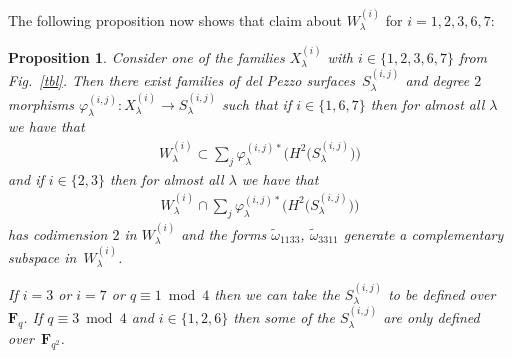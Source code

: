\documentclass[pdftex]{sigma}
\numberwithin{equation}{section}
\newtheorem{Proposition}[Theorem]{Proposition}
 { \theoremstyle{definition}
\newtheorem{Definition}[Theorem]{Definition}
\newtheorem{notation}[Theorem]{Notation}
\newtheorem{Example}[Theorem]{Example}
\newtheorem{Remark}[Theorem]{Remark} }
\begin{document}
The following proposition now shows that claim about $W_{\lambda}^{(i)}$ for $i=1,2,3,6,7$:

\begin{Proposition}\label{prpdelPezzo} Consider one of the families $X_{\lambda}^{(i)}$ with $i\in \{1,2,3,6,7\}$ from Fig.~{\rm \ref{tbl}}. Then there exist families of del Pezzo surfaces~$S^{(i,j)}_{\lambda}$ and degree $2$ morphisms $\varphi^{(i,j)}_{\lambda}\colon X_{\lambda}^{(i)} \to S^{(i,j)}_{\lambda}$ such that if $i\in \{1,6,7\}$ then for almost all $\lambda$ we have that
\begin{gather*} W_\lambda^{(i)} \subset \sum_j \varphi^{(i,j)*}_{\lambda} \big(H^2\big(S^{(i,j)}_{\lambda}\big)\big)\end{gather*}
and if $i\in \{2,3\}$ then for almost all $\lambda$ we have that
\begin{gather*} W_\lambda^{(i)} \cap \sum_j \varphi^{(i,j)*}_{\lambda} \big(H^2\big(S^{(i,j)}_{\lambda}\big) \big)\end{gather*}
has codimension $2$ in $W_{\lambda}^{(i)}$ and the forms $\tilde{\omega}_{1133}$, $\tilde{\omega}_{3311}$ generate a complementary subspace in~$W_\lambda^{(i)}$.

If $i=3$ or $i=7$ or $q\equiv 1 \bmod 4$ then we can take the $S^{(i,j)}_{\lambda}$ to be defined over~$\mathbf{F}_q$. If $q\equiv 3 \bmod 4$ and $i\in\{1,2,6\}$ then some of the $S^{(i,j)}_{\lambda}$ are only defined over~$\mathbf{F}_{q^2}$.
\end{Proposition}
\end{document}
